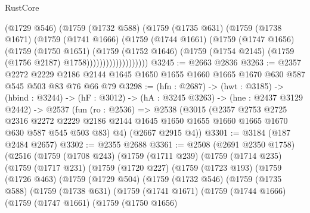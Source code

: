 \begin{lexlean}{RustCore}
\begin{coremodule}
                      (@1729 @546)
                      (@1759
                        (@1732 @588)
                        (@1759
                          (@1735 @631)
                          (@1759
                            (@1738 @1671)
                            (@1759
                              (@1741 @1666)
                              (@1759
                                (@1744 @1661)
                                (@1759
                                  (@1747 @1656)
                                  (@1759
                                    (@1750 @1651)
                                    (@1759
                                      (@1752 @1646)
                                      (@1759
                                        (@1754 @2145)
                                        (@1759 (@1756 @2187) @1758)))))))))))))))))))
@3245 := @2663 @2836
@3263 := @2357
    @2272
    @2229
    @2186
    @2144
    @1645
    @1650
    @1655
    @1660
    @1665
    @1670
    @630
    @587
    @545
    @503
    @83
    @76
    @66
    @79
@3298 := (hfn : @2687) ->
  (hwt : @3185) ->
  (hbind : @3244) ->
  (hF : @3012) ->
  (hA : @3245 @3263) ->
  (hne : @2437 @3129 @2442) ->
  @2537
    (fun (ro : @2536) =>
    @2538
      (@3015
        (@2357
          @2753
          @2725
          @2316
          @2272
          @2229
          @2186
          @2144
          @1645
          @1650
          @1655
          @1660
          @1665
          @1670
          @630
          @587
          @545
          @503
          @83)
        @4)
      (@2667 @2915 @4))
@3301 := @3184 (@187 @2484 @2657)
@3302 := @2355 @2688
@3361 := @2508
    (@2691 @2350 @1758)
    (@2516
      (@1759
        (@1708 @243)
        (@1759
          (@1711 @239)
          (@1759
            (@1714 @235)
            (@1759
              (@1717 @231)
              (@1759
                (@1720 @227)
                (@1759
                  (@1723 @193)
                  (@1759
                    (@1726 @463)
                    (@1759
                      (@1729 @504)
                      (@1759
                        (@1732 @546)
                        (@1759
                          (@1735 @588)
                          (@1759
                            (@1738 @631)
                            (@1759
                              (@1741 @1671)
                              (@1759
                                (@1744 @1666)
                                (@1759
                                  (@1747 @1661)
                                  (@1759
                                    (@1750 @1656)

\end{coremodule}
\end{lexlean}
